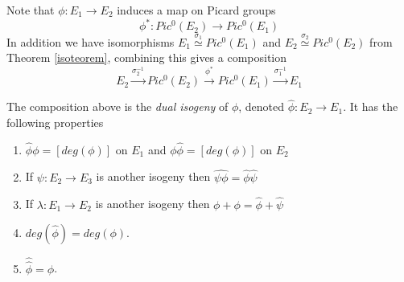 Note that $\phi: E_1 \rightarrow E_2$ induces a map on Picard groups
$$\phi^*: Pic^0(E_2) \rightarrow Pic^0(E_1)$$
In addition we have isomorphisms $E_1 \overset{\sigma_1}{\simeq} Pic^0(E_1)$ and 
$E_2 \overset{\sigma_2}{\simeq} Pic^0(E_2)$ from Theorem \ref{isoteorem}, combining this gives a composition
$$ E_2 \overset{\sigma_2^{-1}}{\rightarrow} Pic^0(E_2) \overset{\phi^*}{\rightarrow} Pic^0(E_1)
\overset{\sigma_1^{-1}}{\rightarrow} E_1 $$

\begin{prop}
 The composition above is the \emph{dual isogeny} of $\phi$, denoted $\widehat{\phi}: E_2 \rightarrow E_1$.
It has the following properties 
\begin{enumerate}
 \item $\widehat{\phi}\phi = [deg(\phi)]$ on $E_1$ and $\phi\widehat{\phi} = [deg(\phi)]$ on $E_2$
 \item If $\psi: E_2 \rightarrow E_3$ is another isogeny then $\widehat{\psi \phi} = \widehat{\phi}\widehat{\psi}$
 \item If $\lambda: E_1 \rightarrow E_2$ is another isogeny then $\widehat{\phi+\phi} = \widehat{\phi}+\widehat{\psi}$
 \item $deg(\widehat{\phi}) = deg(\phi)$.
 \item $\widehat{\widehat{\phi}} = \phi$.
\end{enumerate}

\end{prop}
